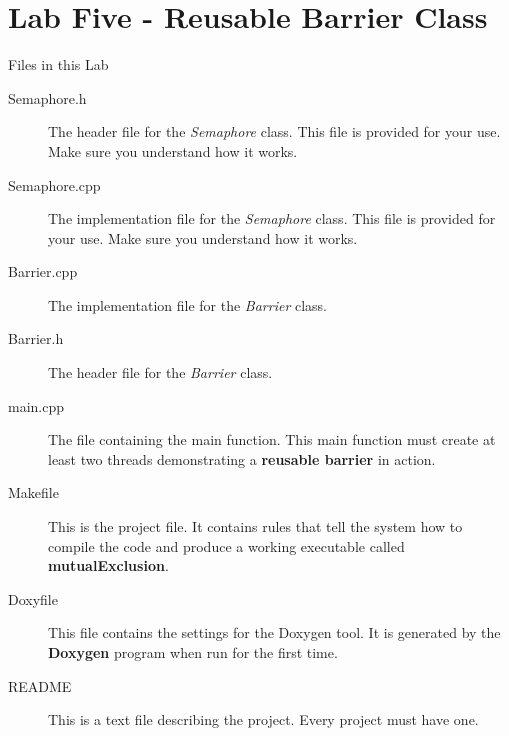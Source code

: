 \documentclass[10pt,a4paper]{article}
\begin{document}
 \section{Lab Five - Reusable Barrier Class}
Files in this Lab
\begin{description}
\item[Semaphore.h] The header file for the \textit{Semaphore} class.  This file is provided for your use.  Make sure you understand how it works.
\item[Semaphore.cpp] The implementation file for the \textit{Semaphore} class.  This file is provided for your use.  Make sure you understand how it works.
    \item[Barrier.cpp] The implementation file for the \textit{Barrier} class.  
    \item[Barrier.h] The header file for the \textit{Barrier} class.
\item[main.cpp] The file containing the main function.  This main function must create at least two threads demonstrating a \textbf{reusable barrier} in action.  
\item[Makefile] This is the project file. It contains rules that tell the system how to compile the code and produce a working executable called \textbf{mutualExclusion}. 
\item[Doxyfile] This file contains the settings for the Doxygen tool. It is generated by the \textbf{Doxygen} program when run for the first time.
\item[README] This is a text file describing the project. Every project must have one.
\end{description}
\end{document}
